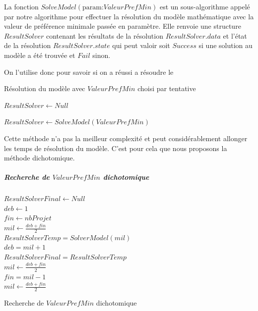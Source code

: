 \documentclass{polytech/polytech}
\begin{document}
La fonction $SolveModel(\text{param:} ValeurPrefMin)$ est un sous-algorithme appelé par notre algorithme pour effectuer la résolution du modèle mathématique avec la valeur de préférence minimale passée en paramètre.
Elle renvoie une structure $ResultSolver$ contenant les résultats de la résolution $ResultSolver.data$ et l'état de la résolution $ResultSolver.state$ qui peut valoir soit $Success$ si une solution au modèle a été trouvée et $Fail$ sinon.

On l'utilise donc pour savoir si on a réussi a résoudre le
\begin{algorithm}
\caption{\label{chap:problem_affectation:algo:recherche_tatonnement}Résolution du modèle avec $ValeurPrefMin$ choisi par tentative}

$ResultSolver \gets Null$ \\

{

	$ResultSolver \gets SolveModel(ValeurPrefMin)$ \\



	{
		\Break

	}
}
\end{algorithm}

Cette méthode n'a pas la meilleur complexité et peut considérablement allonger les temps de résolution du modèle. C'est pour cela que nous proposons la méthode dichotomique.

\subparagraph{Recherche de $ValeurPrefMin$ dichotomique}
\begin{algorithm}
$ResultSolverFinal \gets Null$ \\
$deb \gets 1$ \\
$fin \gets nbProjet$ \\
$mil \gets \frac{deb+fin}{2}$ \\
{
	$ResultSolverTemp=SolverModel(mil)$\\
{
$deb=mil+1$\\
$ResultSolverFinal=ResultSolverTemp$\\
$mil \gets \frac{deb+fin}{2}$ \\
}
\Else
{
	$fin=mil-1$\\
	$mil \gets \frac{deb+fin}{2}$ \\
}
}

\caption{\label{chap:problem_affectation:algo:recherche_dichotomique}Recherche de $ValeurPrefMin$ dichotomique}
\end{algorithm}
\end{document}
